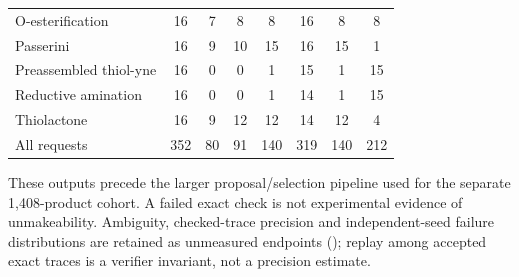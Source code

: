 \begin{table}[H]
\begin{tabular}{@{}>{\raggedright\arraybackslash}p{}ccccccc@{}}
O-esterification & 16 & 7 & 8 & 8 & 16 & 8 & 8 \\
Passerini & 16 & 9 & 10 & 15 & 16 & 15 & 1 \\
Preassembled thiol-yne & 16 & 0 & 0 & 1 & 15 & 1 & 15 \\
Reductive amination & 16 & 0 & 0 & 1 & 14 & 1 & 15 \\
Thiolactone & 16 & 9 & 12 & 12 & 14 & 12 & 4 \\
\midrule
All requests & 352 & 80 & 91 & 140 & 319 & 140 & 212 \\
\bottomrule
\end{tabular}
\par\smallskip\raggedright\scriptsize
These outputs precede the larger proposal/selection pipeline used for the separate 1,408-product cohort. A failed exact check is not experimental evidence of unmakeability. Ambiguity, checked-trace precision and independent-seed failure distributions are retained as unmeasured endpoints (\PendingCell); replay among accepted exact traces is a verifier invariant, not a precision estimate.
\end{table}
